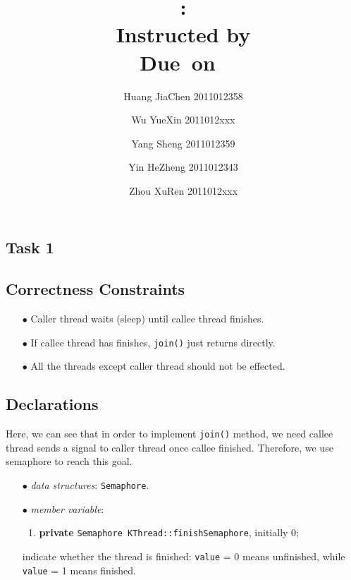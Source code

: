 \documentclass{article}
\title{\textmd{\bf \Class: \Title}\\{\large Instructed by \textit{\ClassInstructor}}\\\normalsize\vspace{0.1in}\small{Due\ on\ \DueDate}}
\date{}
\author{%
  Huang JiaChen 2011012358 \and
  Wu YueXin 2011012xxx \and
  Yang Sheng 2011012359 \and
  Yin HeZheng 2011012343 \and
  Zhou XuRen 2011012xxx}
\begin{document}
  \begin{spacing}{1.1}
    \maketitle \thispagestyle{empty}


\theoremstyle{plain} \newtheorem{computational}{Definition}
    \section{Task 1}

    \subsection{Correctness Constraints}
    \begin{enumerate}
      \item[$\bullet$] Caller thread waits (sleep) until callee thread finishes.
      \item[$\bullet$] If callee thread has finishes, \texttt{join()} just returns
	directly.
      \item[$\bullet$] All the threads except caller thread should not be effected.
    \end{enumerate}

    \subsection{Declarations}
    Here, we can see that in order to implement \texttt{join()} method, we need callee
    thread sends a signal to caller thread once callee finished. Therefore, we use
    semaphore to reach this goal.
    \begin{enumerate}
      \item[$\bullet$] \textit{data structures}: \texttt{Semaphore}.
      \item[$\bullet$] \textit{member variable}:
	\begin{enumerate}
	  \item \textbf{private} \texttt{Semaphore KThread::finishSemaphore}, initially 0;
	\end{enumerate}
	indicate whether the thread is finished: \texttt{value} = 0 means unfinished, while
	\texttt{value} = 1 means finished.

    \end{enumerate}


\end{spacing}
\end{document}
